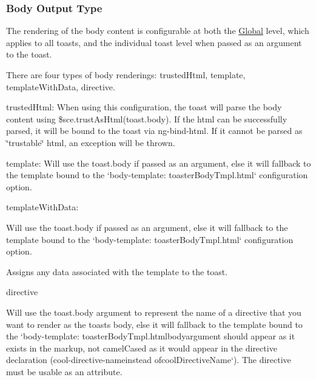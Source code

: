 \subsubsection*{Body Output Type}

The rendering of the body content is configurable at both the \hyperlink{class_global}{Global} level, which applies to all toasts, and the individual toast level when passed as an argument to the toast.

There are four types of body renderings\+: trusted\+Html\textquotesingle{}, \textquotesingle{}template\textquotesingle{}, \textquotesingle{}template\+With\+Data\textquotesingle{}, \textquotesingle{}directive\textquotesingle{}.


\begin{DoxyItemize}
\item trusted\+Html\+: When using this configuration, the toast will parse the body content using {\ttfamily \$sce.\+trust\+As\+Html(toast.\+body)}. If the html can be successfully parsed, it will be bound to the toast via {\ttfamily ng-\/bind-\/html}. If it cannot be parsed as \char`\"{}trustable\char`\"{} html, an exception will be thrown.
\item template\+: Will use the {\ttfamily toast.\+body} if passed as an argument, else it will fallback to the template bound to the `\textquotesingle{}body-\/template\textquotesingle{}\+: \textquotesingle{}toaster\+Body\+Tmpl.\+html\textquotesingle{}` configuration option.
\item template\+With\+Data\+:
\begin{DoxyItemize}
\item Will use the {\ttfamily toast.\+body} if passed as an argument, else it will fallback to the template bound to the `\textquotesingle{}body-\/template\textquotesingle{}\+: \textquotesingle{}toaster\+Body\+Tmpl.\+html\textquotesingle{}` configuration option.
\item Assigns any data associated with the template to the toast.
\end{DoxyItemize}
\item directive
\begin{DoxyItemize}
\item Will use the {\ttfamily toast.\+body} argument to represent the name of a directive that you want to render as the toast\textquotesingle{}s body, else it will fallback to the template bound to the `\textquotesingle{}body-\/template\textquotesingle{}\+: \textquotesingle{}toaster\+Body\+Tmpl.\+htmlbody{\ttfamily argument should appear as it exists in the markup, not camel\+Cased as it would appear in the directive declaration (}cool-\/directive-\/name{\ttfamily instead of}cool\+Directive\+Name`). The directive must be usable as an attribute.


\end{DoxyItemize}
\end{DoxyItemize}
